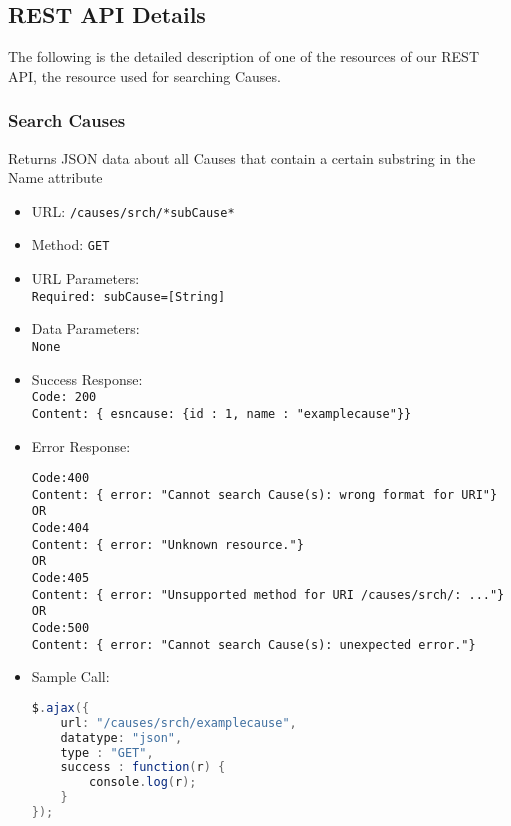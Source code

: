 \subsection{REST API Details}

The following is the detailed description of one of the resources of our REST API, the resource used for searching Causes.

\subsubsection*{Search Causes}


Returns JSON data about all Causes that contain a certain substring in the Name attribute 


\begin{itemize}
    \item URL: \texttt{/causes/srch/*subCause*}
    \item Method: \texttt{GET}
    \item URL Parameters: \texttt{\\Required: subCause=[String] }
    \item Data Parameters: \texttt{\\None}
    \item Success Response: \texttt{\\Code: 200 \\Content: \{ esncause: \{id : 1, name : "examplecause"\}\}} 
    \item Error Response: \begin{verbatim}
Code:400
Content: { error: "Cannot search Cause(s): wrong format for URI"}
OR
Code:404
Content: { error: "Unknown resource."}
OR
Code:405
Content: { error: "Unsupported method for URI /causes/srch/: ..."}
OR
Code:500
Content: { error: "Cannot search Cause(s): unexpected error."}
    \end{verbatim}
    \item Sample Call: \begin{lstlisting}[language = Java]
$.ajax({
    url: "/causes/srch/examplecause",
    datatype: "json",
    type : "GET",
    success : function(r) {
        console.log(r);
    }
});
    \end{lstlisting}
\end{itemize}

